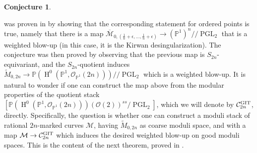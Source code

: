 \documentclass{amsart}
\newcommand{\bP}{\mathbb{P}}
\newcommand{\oH}{\operatorname{H}}
\newcommand{\cC}{\mathcal{C}}
\newcommand{\cM}{\mathcal{M}}
\newcommand{\cO}{\mathcal{O}}
\newcommand{\PGL}{\operatorname{PGL}}
\newcommand{\Mcal}{\mathcal{M}}
\newcommand{\git}{{\rm GIT}}
\theoremstyle{definition}
\newtheorem{Conjecture}[theorem]{Conjecture}
\theoremstyle{definition}
\begin{document}
{\begin{Conjecture}
\end{Conjecture}
 was proven in \cite{moduli_pointed_curves_via_git} by showing that the corresponding statement for ordered points is true, namely that there is a map $\overline{\cM}_{0,(\frac{1}{n}  + \epsilon,\ldots,\frac{1}{n}  + \epsilon)}\to (\bP^1)^n/\!\!/\PGL_2$ that is a weighted blow-up (in this case, it is the Kirwan desingularization). The conjecture was then proved by observing that the previous map is $S_{2n}$-equivariant, and the $S_{2n}$-quotient induces $\widetilde{M}_{0,2n}\to \bP(\oH^0(\bP^1,\cO_{\bP^1}(2n)))/\!\!/\PGL_2$ which is a weighted blow-up.
It is natural to wonder if one can construct the map above from the modular properties of the quotient stack $[\bP(\oH^0(\bP^1,\cO_{\bP^1}(2n)))(\cO(2))^{ss}/\PGL_2]$, which we will denote by $\cC^{\git}_{2n}$, directly. Specifically, the question is whether one can construct a moduli stack of rational $2n$-marked curves $\Mcal$, having $\widetilde{M}_{0,2n}$ as coarse moduli space, and with a map $\cM\to \cC^{\git}_{2n}$ which induces the desired weighted blow-up on good moduli spaces. This is the content of the next theorem, proved in .

}
\end{document}
